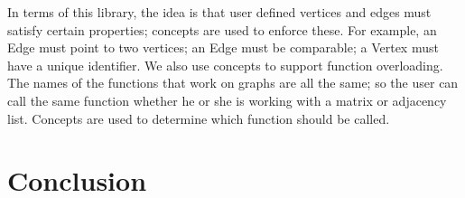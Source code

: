 \documentclass{article}
\begin{document}
In terms of this library, the idea is that user defined vertices and edges must satisfy certain properties; concepts are used to enforce these. For example, an Edge must point to two vertices; an Edge must be comparable; a Vertex must have a unique identifier. We also use concepts to support function overloading. The names of the functions that work on graphs are all the same; so the user can call the same function whether he or she is working with a matrix or adjacency list. Concepts are used to determine which function should be called.
\section{Conclusion}
\end{document}

